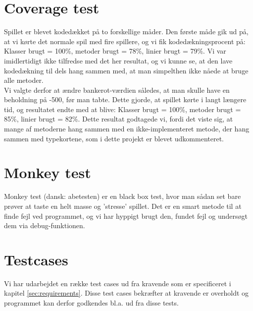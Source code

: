 \section{Coverage test}
Spillet er blevet kodedækket på to forskellige måder.
Den første måde gik ud på, at vi kørte det normale spil med fire spillere, og vi fik kodedækningsprocent på: Klasser brugt = 100\%, metoder brugt = 78\%, linier brugt = 79\%.
Vi var imidlertidigt ikke tilfredse med det her resultat, og vi kunne se, at den lave kodedækning til dels hang sammen med, at man simpelthen ikke nåede at bruge alle metoder.
\\ Vi valgte derfor at ændre bankerot-værdien således, at man skulle have en beholdning på -500, før man tabte. Dette gjorde, at spillet kørte i langt længere tid, og resultatet endte med at blive: Klasser brugt = 100\%, metoder brugt = 85\%, linier brugt = 82\%.
Dette resultat godtagede vi, fordi det viste sig, at mange af metoderne hang sammen med en ikke-implementeret metode, der hang sammen med typekortene, som i dette projekt er blevet udkommenteret.

\section{Monkey test}
Monkey test (dansk: abetesten) er en black box test, hvor man sådan set bare prøver at taste en helt masse og 'stresse' spillet.
Det er en smart metode til at finde fejl ved programmet, og vi har hyppigt brugt den, fundet fejl og undersøgt dem via debug-funktionen.

\section{Testcases}
Vi har udarbejdet en række test cases ud fra kravende som er specificeret i kapitel \ref{sec:requirements}.
Disse test cases bekræfter at kravende er overholdt og programmet kan derfor godkendes bl.a. ud fra disse tests.

